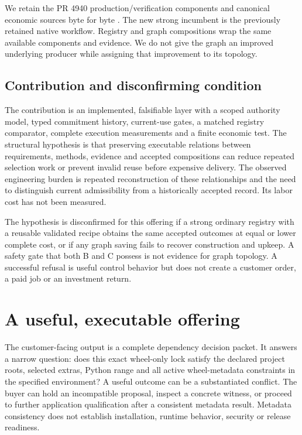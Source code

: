\documentclass[11pt,a4paper]{article}
\begin{document}
We retain the PR 4940 production/verification components and canonical economic sources byte for byte \citep{priorsecond}. The new strong incumbent is the previously retained native workflow. Registry and graph compositions wrap the same available components and evidence. We do not give the graph an improved underlying producer while assigning that improvement to its topology.

\subsection{Contribution and disconfirming condition}
The contribution is an implemented, falsifiable layer with a scoped authority model, typed commitment history, current-use gates, a matched registry comparator, complete execution measurements and a finite economic test. The structural hypothesis is that preserving executable relations between requirements, methods, evidence and accepted compositions can reduce repeated selection work or prevent invalid reuse before expensive delivery. The observed engineering burden is repeated reconstruction of these relationships and the need to distinguish current admissibility from a historically accepted record. Its labor cost has not been measured.

The hypothesis is disconfirmed for this offering if a strong ordinary registry with a reusable validated recipe obtains the same accepted outcomes at equal or lower complete cost, or if any graph saving fails to recover construction and upkeep. A safety gate that both B and C possess is not evidence for graph topology. A successful refusal is useful control behavior but does not create a customer order, a paid job or an investment return.

\section{A useful, executable offering}
\label{sec:offering}
The customer-facing output is a complete dependency decision packet. It answers a narrow question: does this exact wheel-only lock satisfy the declared project roots, selected extras, Python range and all active wheel-metadata constraints in the specified environment? A useful outcome can be a substantiated conflict. The buyer can hold an incompatible proposal, inspect a concrete witness, or proceed to further application qualification after a consistent metadata result. Metadata consistency does not establish installation, runtime behavior, security or release readiness.
\end{document}
